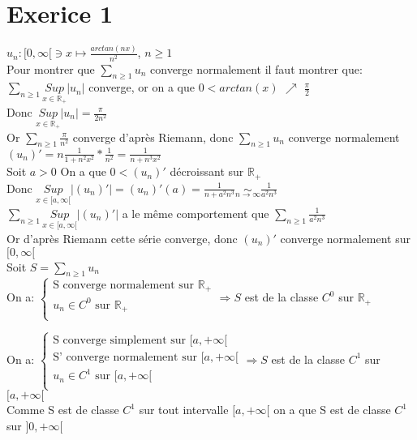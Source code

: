 \documentclass{article}
\author{Frederic Becerril}
\newcommand{\mysim}[2]{\underset{#1 \rightarrow #2}{\sim}}
\newcommand{\mysupp}[1]{\underset{x \in #1}{Sup}}
\begin{document}
\part*{Exerice 1}

$u_n : [0, \infty[ \ni x \longmapsto \frac{arctan(nx)}{n^2}$, $n \geq 1$\\
Pour montrer que $\sum_{n \geq 1} u_n$ converge normalement il faut montrer que:\\
$\sum_{n \geq 1} \mysupp{\mathbb{R}_+} |u_n|$ converge, or on a que $0 < arctan(x)$ $\nearrow$ $\frac{\pi}{2}$\\
Donc $\mysupp{\mathbb{R}_+} |u_n| = \frac{\pi}{2n^2}$\\
Or $\sum_{n \geq 1} \frac{\pi}{n^2}$ converge d'après Riemann, donc $\sum_{n \geq 1} u_n$ converge normalement\\
$(u_n)' = n\frac{1}{1 + n^2x^2} * \frac{1}{n^2} = \frac{1}{n + n^3x^2}$\\
Soit $a > 0$
On a que $0 < (u_n)'$ décroissant sur $\mathbb{R}_+$\\
Donc $\mysupp{[a, \infty[} |(u_n)'| = (u_n)'(a) = \frac{1}{n + a^2n^3} \mysim{n}{\infty} \frac{1}{a^2n^3}$\\
$\sum_{n\geq 1} \mysupp{[a, \infty[} |(u_n)'|$ a le même comportement que $\sum_{n\geq 1} \frac{1}{a^2n^3}$\\
Or d'après Riemann cette série converge, donc $(u_n)'$ converge normalement sur $[0, \infty[$\\
Soit $S = \sum_{n \geq 1} u_n$\\
On a: $\left\{
    \begin{array}{ll}
        \mbox{S converge normalement sur } \mathbb{R}_+\\
        u_n \in C^0 \mbox{ sur } \mathbb{R}_+\\
    \end{array}
\right. \Rightarrow S$ est de la classe $C^0$ sur $\mathbb{R}_+$

On a: $\left\{
    \begin{array}{ll}
        \mbox{S converge simplement sur } [a, +\infty[\\
        \mbox{S' converge normalement sur } [a, +\infty[\\
        u_n \in C^1 \mbox{ sur } [a, +\infty[\\
    \end{array}
\right. \Rightarrow S$ est de la classe $C^1$ sur $[a, +\infty[$\\
Comme S est de classe $C^1$ sur tout intervalle $[a, +\infty[$ on a que S est de classe $C^1$ sur $]0, +\infty[$
\end{document}
